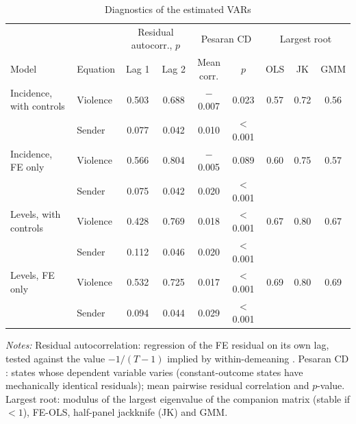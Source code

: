 \begin{table}[htbp]
\centering
\footnotesize
\caption{Diagnostics of the estimated VARs}
\label{tab:modeldiag}
\begin{threeparttable}
\begin{tabular}{llccccccc}
\toprule
 & & \multicolumn{2}{c}{Residual autocorr., $p$} & \multicolumn{2}{c}{Pesaran CD} & \multicolumn{3}{c}{Largest root} \\
\cmidrule(lr){3-4}\cmidrule(lr){5-6}\cmidrule(lr){7-9}
Model & Equation & Lag 1 & Lag 2 & \makecell{Mean\\corr.} & $p$ & OLS & JK & GMM \\
\midrule
Incidence, with controls & Violence & 0.503 & 0.688 & $-$0.007 & 0.023 & 0.57 & 0.72 & 0.56 \\
 & Sender & 0.077 & 0.042 & 0.010 & $<$0.001 &  & &  \\
Incidence, FE only & Violence & 0.566 & 0.804 & $-$0.005 & 0.089 & 0.60 & 0.75 & 0.57 \\
 & Sender & 0.075 & 0.042 & 0.020 & $<$0.001 &  & &  \\
Levels, with controls & Violence & 0.428 & 0.769 & 0.018 & $<$0.001 & 0.67 & 0.80 & 0.67 \\
 & Sender & 0.112 & 0.046 & 0.020 & $<$0.001 &  & &  \\
Levels, FE only & Violence & 0.532 & 0.725 & 0.017 & $<$0.001 & 0.69 & 0.80 & 0.69 \\
 & Sender & 0.094 & 0.044 & 0.029 & $<$0.001 &  & &  \\
\bottomrule
\end{tabular}
\begin{tablenotes}[flushleft]\footnotesize
\item \textit{Notes:} Residual autocorrelation: regression of the FE residual on its own lag, tested against the value $-1/(T-1)$ implied by within-demeaning \citep[section 10.5.4]{wooldridge2010}. Pesaran CD \citep{pesaran2015}: states whose dependent variable varies (constant-outcome states have mechanically identical residuals); mean pairwise residual correlation and $p$-value. Largest root: modulus of the largest eigenvalue of the companion matrix (stable if $<1$), FE-OLS, half-panel jackknife (JK) and GMM.
\end{tablenotes}
\end{threeparttable}
\end{table}
